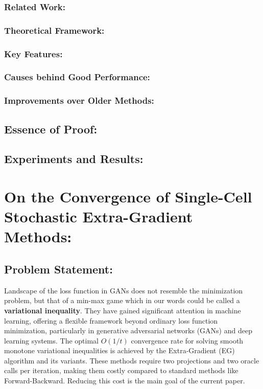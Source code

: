 \documentclass[11pt]{article}
\begin{document}
		\subsubsection{Related Work:}
		
		\subsubsection{Theoretical Framework:}
		
		\subsubsection{Key Features:}
		
		\subsubsection{Causes behind Good Performance:}
		
		\subsubsection{Improvements over Older Methods:}
	
	\subsection{Essence of Proof:} %
	
	\subsection{Experiments and Results:}

\section{On the Convergence of Single-Cell Stochastic Extra-Gradient Methods:}

	\subsection{Problem Statement:}
        Landscape of the loss function in GANs does not resemble the minimization problem, but that of a min-max game which in our words could be called a \textbf{variational inequality}. They have gained significant attention in machine learning, offering a flexible framework beyond ordinary loss function minimization, particularly in generative adversarial networks (GANs) and deep learning systems. The optimal $O(1/t)$ convergence rate for solving smooth monotone variational inequalities is achieved by the Extra-Gradient (EG) algorithm and its variants. These methods require two projections and two oracle calls per iteration, making them costly compared to standard methods like Forward-Backward. Reducing this cost is the main goal of the current paper.
	
\end{document}
